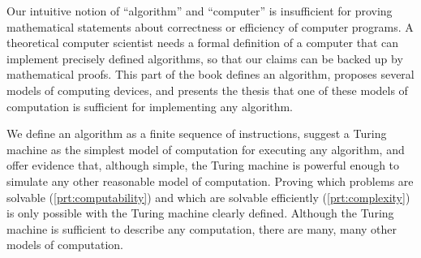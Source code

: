 Our intuitive notion of ``algorithm'' and ``computer'' is insufficient for proving mathematical statements about correctness or efficiency of computer programs.
A theoretical computer scientist needs a formal definition of a computer that can implement precisely defined algorithms, so that our claims can be backed up by mathematical proofs.
This part of the book defines an algorithm, proposes several models of computing devices, and presents the thesis that one of these models of computation is sufficient for implementing any algorithm.

We define an algorithm as a finite sequence of instructions, suggest a Turing machine as the simplest model of computation for executing any algorithm, and offer evidence that, although simple, the Turing machine is powerful enough to simulate any other reasonable model of computation.
Proving which problems are solvable (\autoref{prt:computability}) and which are solvable efficiently (\autoref{prt:complexity}) is only possible with the Turing machine clearly defined.
Although the Turing machine is sufficient to describe any computation, there are many, many other models of computation.
